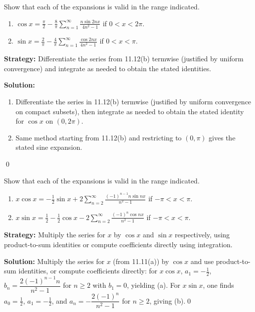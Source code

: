 \begin{problembox}
Show that each of the expansions is valid in the range indicated.
\begin{enumerate}[label=(\alph*)]
\item $\cos x = \frac{\pi}{2} - \frac{8}{\pi} \sum_{n=1}^\infty \frac{n \sin 2nx}{4n^2 - 1}$ if $0 < x < 2\pi$.
\item $\sin x = \frac{2}{\pi} - \frac{4}{\pi} \sum_{n=1}^\infty \frac{\cos 2nx}{4n^2 - 1}$ if $0 < x < \pi$.
\end{enumerate}
\end{problembox}

\noindent\textbf{Strategy:} Differentiate the series from 11.12(b) termwise (justified by uniform convergence) and integrate as needed to obtain the stated identities.

\bigskip\noindent\textbf{Solution:}
\begin{enumerate}[label=(\alph*)]
\item Differentiate the series in 11.12(b) termwise (justified by uniform convergence on compact subsets), then integrate as needed to obtain the stated identity for $\cos x$ on $(0,2\pi)$.
\item Same method starting from 11.12(b) and restricting to $(0,\pi)$ gives the stated sine expansion.
\end{enumerate}\qed


\begin{problembox}
Show that each of the expansions is valid in the range indicated.
\begin{enumerate}[label=(\alph*)]
\item $x \cos x = -\frac{1}{2} \sin x + 2 \sum_{n=2}^\infty \frac{(-1)^{n-1} n \sin nx}{n^2 - 1}$ if $-\pi < x < \pi$.
\item $x \sin x = \frac{1}{2} - \frac{1}{2} \cos x - 2 \sum_{n=2}^\infty \frac{(-1)^n \cos nx}{n^2 - 1}$ if $-\pi < x < \pi$.
\end{enumerate}
\end{problembox}

\noindent\textbf{Strategy:} Multiply the series for $x$ by $\cos x$ and $\sin x$ respectively, using product-to-sum identities or compute coefficients directly using integration.

\bigskip\noindent\textbf{Solution:}
Multiply the series for $x$ (from 11.11(a)) by $\cos x$ and use product-to-sum identities, or compute coefficients directly: for $x\cos x$, $a_1= -\tfrac{1}{2}$, $b_n=\dfrac{2(-1)^{n-1}n}{n^2-1}$ for $n\ge2$ with $b_1=0$, yielding (a). For $x\sin x$, one finds $a_0=\tfrac{1}{2}$, $a_1=-\tfrac{1}{2}$, and $a_n= -\dfrac{2(-1)^n}{n^2-1}$ for $n\ge2$, giving (b).\qed


